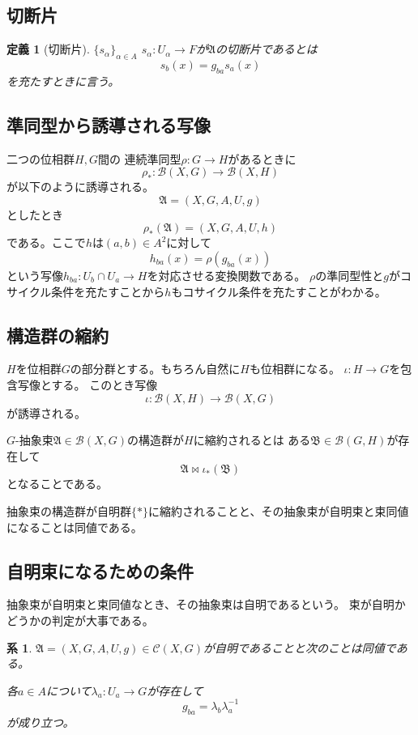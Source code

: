 \documentclass[leqno]{jsarticle}
\newtheorem{cor}[thm]{系}
\newtheorem{df}[thm]{定義}
\newcommand{\al}{\alpha}
\begin{document}
\subsection{切断片}
\begin{df}[切断片]
$\{s_{\alpha}\}_{\al\in A}$ $s_{\al}:U_{\al}\to F$が$\mathfrak{A}$の切断片であるとは
\[
s_b(x)=g_{ba}s_a(x)
\]
を充たすときに言う。
\end{df}
\subsection{準同型から誘導される写像}
二つの位相群$H,G$間の
連続準同型$\rho:G\to H$があるときに
\[
\rho_{*}:\mathscr{B}(X,G)\to \mathscr{B}(X,H)
\]
が以下のように誘導される。
\[
\mathfrak{A}=(X, G, A, U, g)
\]
としたとき
\[
\rho_{*}(\mathfrak{A})=(X, G, A, U, h)
\]
である。ここで$h$は$(a,b)\in A^2$に対して
\[
h_{ba}(x)=\rho(g_{ba}(x))
\]
という写像$h_{ba}:U_b\cap U_a\to H$を対応させる変換関数である。
$\rho$の準同型性と$g$がコサイクル条件を充たすことから$h$もコサイクル条件を充たすことがわかる。
\subsection{構造群の縮約}

$H$を位相群$G$の部分群とする。もちろん自然に$H$も位相群になる。
$\iota : H\to G$を包含写像とする。
このとき写像
\[
\iota:\mathscr{B}(X,H)\to \mathscr{B}(X,G)
\]
が誘導される。

$G$-抽象束$\mathfrak{A}\in \mathscr{B}(X,G)$の構造群が$H$に縮約されるとは
ある$\mathfrak{B}\in \mathscr{B}(G,H)$が存在して
\[
\mathfrak{A}\bowtie \iota_{*}(\mathfrak{B})
\]
となることである。

抽象束の構造群が自明群$\{*\}$に縮約されることと、その抽象束が自明束と束同値になることは同値である。
\subsection{自明束になるための条件}
抽象束が自明束と束同値なとき、その抽象束は自明であるという。
束が自明かどうかの判定が大事である。
\begin{cor}
$\mathfrak{A}=(X, G, A, U, g)\in \mathscr{C}(X,G)$が自明であることと次のことは同値である。
\par
各$a\in A$について$\lambda_a:U_a\to G$が存在して
\[
g_{ba}=\lambda_b\lambda_{a}^{-1}
\]
が成り立つ。
\end{cor}
\end{document}
